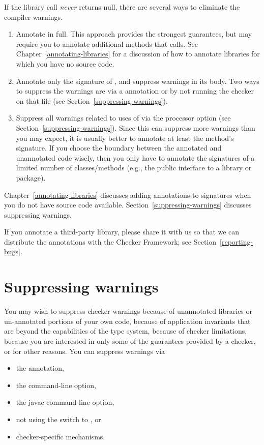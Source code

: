 If the library call \emph{never} returns null,
there are several ways to eliminate the compiler warnings.
\begin{enumerate}
\item Annotate  in full.  This approach provides
  the strongest guarantees, but may require you to annotate additional
  methods that  calls.  See
  Chapter~\ref{annotating-libraries} for a discussion of how to annotate
  libraries for which you have no source code.
\item Annotate only the signature of , and
  suppress warnings in its body.  Two ways to suppress the warnings are via a
   annotation or by not running the checker on that
  file (see Section~\ref{suppressing-warnings}).
\item Suppress all warnings related to uses of 
  via the  processor option
  (see Section~\ref{suppressing-warnings}).
  Since this can suppress more warnings than you may expect,
  it is usually better to annotate at least the method's signature.  If you
  choose the boundary between the annotated and unannotated code wisely,
  then you only have to annotate the signatures of a limited number of
  classes/methods
  (e.g., the public interface to a library or package).
  
\end{enumerate}

Chapter~\ref{annotating-libraries} discusses adding annotations to
signatures when you do not have source code available.
Section~\ref{suppressing-warnings} discusses suppressing warnings.


If you annotate a third-party library, please share it with us so that we
can distribute the annotations with the Checker Framework; see
Section~\ref{reporting-bugs}.


\section{Suppressing warnings\label{suppressing-warnings}}

You may wish to suppress checker warnings because of unannotated libraries
or un-annotated portions of your own code, because of application
invariants that are beyond the capabilities of the type system, because of
checker limitations, because you are interested in only some of the
guarantees provided by a checker, or for other reasons.  You can suppress
warnings via
\begin{itemize}
\item
  the  annotation,
\item
  the  command-line option,
\item
  the javac  command-line option,
\item
  not using the  switch to , or
\item
  checker-specific mechanisms.
\end{itemize}

